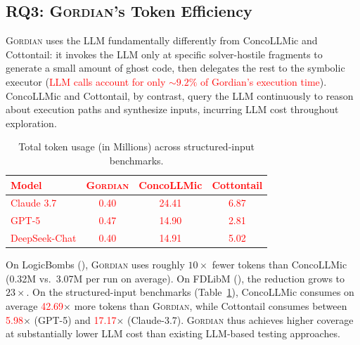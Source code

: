 \documentclass[acmsmall,screen,nonacm]{acmart}
\newcommand{\rev}[1]{\textcolor{red}{#1}}
\newcommand{\rev}[1]{#1}
\newcommand{\projName}{\textsc{Gordian}\xspace}
\theoremstyle{definition}
\begin{document}
\subsection{RQ3: \projName's Token Efficiency}


\projName{} uses the LLM fundamentally differently from ConcoLLMic and Cottontail: it invokes the LLM only at specific solver-hostile fragments to generate a small amount of ghost code, then delegates the rest to the symbolic executor (\rev{LLM calls account for only ${\sim}9.2\%$ of Gordian's execution time}). ConcoLLMic and Cottontail, by contrast, query the LLM continuously to reason about execution paths and synthesize inputs, incurring LLM cost throughout exploration.

\begin{table}
  \vspace{-3mm}
\centering
\caption{Total token usage (in Millions) across structured-input benchmarks.}
\label{tab:token-usage}
\footnotesize
\begin{tabular}{lccc}
\toprule
\rev{Model} & \rev{\projName{}} & \rev{ConcoLLMic} & \rev{Cottontail} \\
\midrule
\rev{Claude 3.7}    & \rev{0.40} & \rev{24.41} & \rev{6.87} \\
\rev{GPT-5}         & \rev{0.47} & \rev{14.90} & \rev{2.81} \\
\rev{DeepSeek-Chat} & \rev{0.40} & \rev{14.91} & \rev{5.02} \\
\bottomrule
\end{tabular}
  \vspace{-2mm}
\end{table}

On LogicBombs (), \projName{} uses roughly $10\times$ fewer tokens than ConcoLLMic (0.32M vs.\ 3.07M per run on average). On FDLibM (), the reduction grows to $23\times$. On the structured-input benchmarks (Table~\ref{tab:token-usage}), ConcoLLMic consumes on average \rev{42.69}$\times$ more tokens than \projName{}, while Cottontail consumes between \rev{5.98}$\times$ (GPT-5) and \rev{17.17}$\times$ (Claude-3.7). \projName{} thus achieves higher coverage at substantially lower LLM cost than existing LLM-based testing approaches.
\end{document}
